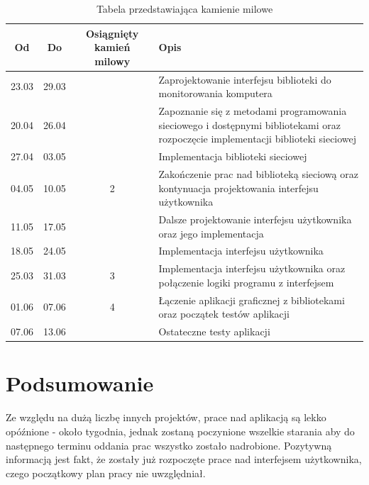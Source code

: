 \documentclass[a4paper]{article}
\begin{document}
\begin{table}[h]
			\centering
			\begin{tabularx}{0.8\textwidth}{|c|c|c|X|}
				\hline
				Od & Do & Osiągnięty kamień milowy & Opis \\ \hline
				23.03 & 29.03 &  & Zaprojektowanie interfejsu biblioteki do monitorowania komputera \\ \hline
				20.04 & 26.04 &  & Zapoznanie się z metodami programowania sieciowego i dostępnymi bibliotekami oraz  rozpoczęcie implementacji biblioteki sieciowej\\ \hline
				27.04 & 03.05 &  & Implementacja biblioteki sieciowej \\ \hline
				04.05 & 10.05 & 2 & Zakończenie prac nad biblioteką sieciową oraz kontynuacja projektowania interfejsu użytkownika \\ \hline
				11.05 & 17.05 &    & Dalsze projektowanie interfejsu użytkownika oraz jego implementacja \\ \hline
				18.05 & 24.05 &  & Implementacja interfejsu użytkownika \\ \hline
				25.03 & 31.03 & 3 & Implementacja interfejsu użytkownika oraz połączenie logiki programu z interfejsem \\ \hline
				01.06 & 07.06 & 4 & Łączenie aplikacji graficznej z bibliotekami oraz początek testów aplikacji \\ \hline
				07.06 & 13.06 &  & Ostateczne testy aplikacji \\ \hline
			\end{tabularx}
			\caption{Tabela przedstawiająca kamienie milowe}
			\label{tabela_harmonogram}
		\end{table}

\section{Podsumowanie}
Ze względu na dużą liczbę innych projektów, prace nad aplikacją są lekko opóźnione - około tygodnia, jednak zostaną poczynione wszelkie starania aby do następnego terminu oddania prac wszystko zostało nadrobione. 
Pozytywną informacją jest fakt, że zostały już rozpoczęte prace nad interfejsem użytkownika, czego początkowy plan pracy nie uwzględniał.
\end{document}
